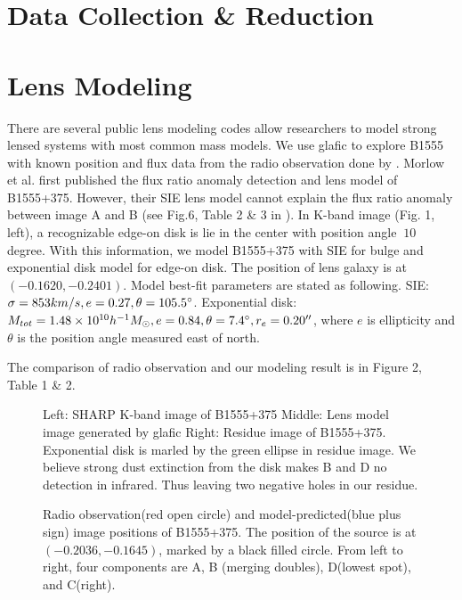 \documentclass[manuscript]{emulateapj}
\begin{document}
\section{Data Collection \& Reduction}

\section{Lens Modeling}
There are several public lens modeling codes allow researchers to model strong lensed systems with most common mass models. We use glafic \citep{Oguri} to explore B1555 with known position and flux data from the radio observation done by \citet{Marlow}. Morlow et al. first published the flux ratio anomaly detection and lens model of B1555+375. However, their SIE lens model cannot explain the flux ratio anomaly between image A and B (see Fig.6, Table 2 \& 3 in \citet{Marlow}). In K-band image (Fig. 1, left), a recognizable edge-on disk is lie in the center with position angle $~10$ degree. With this information, we model B1555+375 with SIE for bulge and exponential disk model for edge-on disk. The position of lens galaxy is at $(-0.1620, -0.2401)$. Model best-fit parameters are stated as following. 
SIE: $\sigma =853 km/s, e=0.27, \theta = 105.5 \mbox{$^\circ$}$. 
Exponential disk: $M_{tot}=1.48 \times 10^{10} h^{-1} M_{\odot}, e=0.84, \theta=7.4 \mbox{$^\circ$}, r_e = 0.20'' $, where $e$ is ellipticity and $\theta$ is the position angle measured east of north.

The comparison of radio observation and our modeling result is in Figure 2, Table 1 \& 2.\\

\begin{figure}
\caption{Left: SHARP K-band image of B1555+375 Middle: Lens model image generated by glafic Right: Residue image of B1555+375.\\
Exponential disk is marled by the green ellipse in residue image. We believe strong dust extinction from the disk makes B and D no detection in infrared. Thus leaving two negative holes in our residue.\label{fig1}}
\end{figure}

\begin{figure}
\caption{Radio observation(red open circle) and model-predicted(blue plus sign) image positions of B1555+375. The position of the source is at $(-0.2036,-0.1645)$, marked by a black filled circle. From left to right, four components are A, B (merging doubles), D(lowest spot), and C(right).\label{fig2}}
\end{figure}
\end{document}
